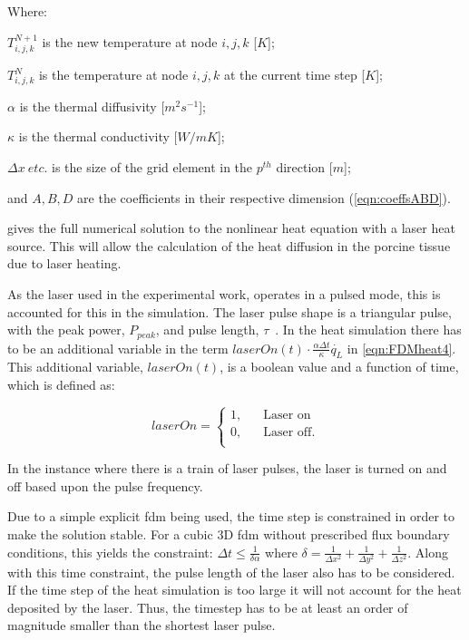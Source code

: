 \noindent Where:

	\indent $T^{N+1}_{i,j,k}$ is the new temperature at node $i,j,k$ [$K$];
	
	\indent $T^N_{i,j,k}$ is the temperature at node $i,j,k$ at the current time step [$K$];
	
	\indent $\alpha$ is the thermal diffusivity [$m^2 s^{-1}$];
	
	\indent $\kappa$ is the thermal conductivity [$W/m K$];
	
	\indent $\Delta x\ etc.$ is the size of the grid element in the $p^{th}$ direction [$m$];
	
	\indent and $A, B,D$ are the coefficients in their respective dimension (\cref{eqn:coeffsABD}).

	\medskip
	
 gives the full numerical solution to the nonlinear heat equation with a laser heat source. This will allow the calculation of the heat diffusion in the porcine tissue due to laser heating.

\medskip

As the laser used in the experimental work, operates in a pulsed mode, this is accounted for this in the simulation. The laser pulse shape is a triangular pulse, with the peak power, $P_{peak}$, and pulse length, $\tau$~\cite{pixelco2manual}. In the heat simulation there has to be an additional variable in the term $laserOn(t)\cdot\tfrac{\alpha \Delta t}{\kappa}\dot{q_L}$ in \cref{eqn:FDMheat4}. This additional variable, $laserOn(t)$, is a boolean value and a function of time, which is defined as:

\[   
laserOn = 
     \begin{cases}
       \text{1,} &\quad\text{Laser on}\\
       \text{0,} &\quad\text{Laser off}.\\
     \end{cases}
\]

In the instance where there is a train of laser pulses, the laser is turned on and off based upon the pulse frequency.

\medskip

Due to a simple explicit \gls*{fdm} being used, the time step is constrained in order to make the solution stable. For a cubic 3D \gls*{fdm} without prescribed flux boundary conditions, this yields the constraint: $\Delta t \leq \tfrac{1}{\delta \alpha}$ where $\delta=\tfrac{1}{\Delta x^2}+\tfrac{1}{\Delta y^2}+\tfrac{1}{\Delta z^2}$. Along with this time constraint, the pulse length of the laser also has to be considered. If the time step of the heat simulation is too large it will not account for the heat deposited by the laser. Thus, the timestep has to be at least an order of magnitude smaller than the shortest laser pulse.

